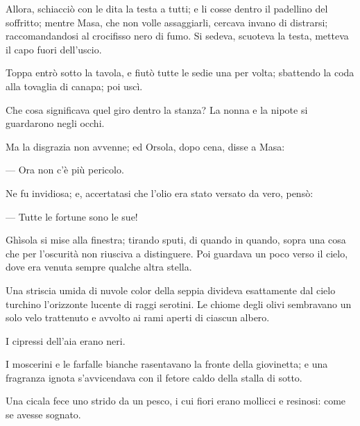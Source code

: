 Allora, schiacciò con le dita la testa a tutti; e li cosse dentro il padellino del soffritto; mentre Masa, che non volle assaggiarli, cercava invano di distrarsi; raccomandandosi al crocifisso nero di fumo. Si sedeva, scuoteva la testa, metteva il capo fuori dell’uscio.

Toppa entrò sotto la tavola, e fiutò tutte le sedie una per volta; sbattendo la coda alla tovaglia di canapa; poi uscì.

Che cosa significava quel giro dentro la stanza? La nonna e la nipote si guardarono negli occhi.

Ma la disgrazia non avvenne; ed Orsola, dopo cena, disse a Masa:

— Ora non c’è più pericolo.

Ne fu invidiosa; e, accertatasi che l’olio era stato versato da vero, pensò:

— Tutte le fortune sono le sue!

Ghìsola si mise alla finestra; tirando sputi, di quando in quando, sopra una cosa che per l’oscurità non riusciva a distinguere. Poi guardava un poco verso il cielo, dove era venuta sempre qualche altra stella.

Una striscia umida di nuvole color della seppia divideva esattamente dal cielo turchino l’orizzonte lucente di raggi serotini. Le chiome degli olivi sembravano un solo velo trattenuto e avvolto ai rami aperti di ciascun albero.

I cipressi dell’aia erano neri.

I moscerini e le farfalle bianche rasentavano la fronte della giovinetta; e una fragranza ignota s’avvicendava con il fetore caldo della stalla di sotto.

Una cicala fece uno strido da un pesco, i cui fiori erano mollicci e resinosi: come se avesse sognato.
